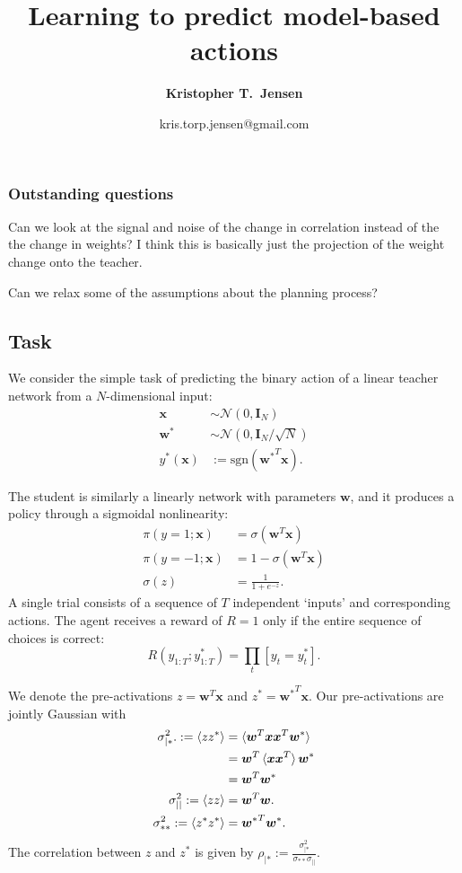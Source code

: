 \documentclass{article}
\title{\Large{Learning to predict model-based actions}}
\author[1]{\normalsize \bfseries Kristopher T.\ Jensen}
\affil[1]{ \small Sainsbury Wellcome Centre, University College London, London, UK}
\date{\vspace*{-2.0em}
\normalsize kris.torp.jensen@gmail.com
}
\renewcommand\b\bm
\begin{document}
\maketitle

\subsubsection*{Outstanding questions}

Can we look at the signal and noise of the change in correlation instead of the the change in weights?
I think this is basically just the projection of the weight change onto the teacher.

Can we relax some of the assumptions about the planning process?

\subsection*{Task}

We consider the simple task of predicting the binary action of a linear teacher network from a $N$-dimensional input:
\begin{align}
    \b{x} &\sim \mathcal{N}(0, \b{I}_N)\\
    \b{w}^* &\sim \mathcal{N}(0, \b{I}_N / \sqrt{N})\\
    y^*(\b{x}) &:= \text{sgn}({\b{w}^*}^T \b{x}).
\end{align}

The student is similarly a linearly network with parameters $\b{w}$, and it produces a policy through a sigmoidal nonlinearity:
\begin{align}
    \pi(y = 1; \b{x}) &= \sigma(\b{w}^T \b{x})\\
    \pi(y=-1; \b{x}) &= 1-\sigma(\b{w}^T \b{x})\\
    \sigma(z) &= \frac{1}{1 + e^{-z}}.
\end{align}
A single trial consists of a sequence of $T$ independent `inputs' and corresponding actions.
The agent receives a reward of $R = 1$ only if the entire sequence of choices is correct:
\begin{equation}
    R(y_{1:T} ; y^*_{1:T}) = \prod_t [y_t = y^*_t].
\end{equation}

We denote the pre-activations $z = \b{w}^T \b{x}$ and $z^* = {\b{w}^*}^T \b{x}$.
Our pre-activations are jointly Gaussian with
\begin{align}
    \sigma_{|*}^2. := \braket{z z^*} &= \braket{\b{w}^T \b{x} \b{x}^T \b{w}^*} \\
    &= \b{w}^T \braket{\b{x} \b{x}^T } \b{w}^*\\
    &= \b{w}^T \b{w}^*\\
    \sigma_{||}^2 := \braket{z z} &= \b{w}^T \b{w} .\\
    \sigma_{**}^2 := \braket{z^* z^*} &= {\b{w}^*}^T \b{w}^*.
\end{align}
The correlation between $z$ and $z^*$ is given by $\rho_{|*} := \frac{\sigma_{|*}^2}{\sigma_{**} \sigma_{||}}$.
\end{document}
